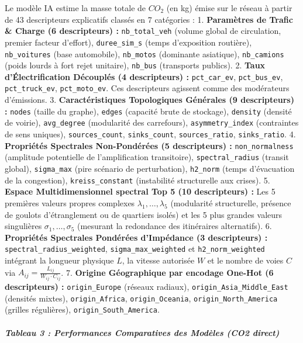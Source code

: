 \documentclass[10pt, a4paper]{article}
\begin{document}
Le modèle IA estime la masse totale de \(CO_2\) (en kg) émise sur le
réseau à partir de 43 descripteurs explicatifs classés en 7 catégories :
1. \textbf{Paramètres de Trafic \& Charge (6 descripteurs) :}
\texttt{nb\_total\_veh} (volume global de circulation, premier facteur
d'effort), \texttt{duree\_sim\_s} (temps d'exposition routière),
\texttt{nb\_voitures} (base automobile), \texttt{nb\_motos} (dominante
asiatique), \texttt{nb\_camions} (poids lourds à fort rejet unitaire),
\texttt{nb\_bus} (transports publics). 2. \textbf{Taux d'Électrification
Découplés (4 descripteurs) :} \texttt{pct\_car\_ev},
\texttt{pct\_bus\_ev}, \texttt{pct\_truck\_ev}, \texttt{pct\_moto\_ev}.
Ces descripteurs agissent comme des modérateurs d'émissions. 3.
\textbf{Caractéristiques Topologiques Générales (9 descripteurs) :}
\texttt{nodes} (taille du graphe), \texttt{edges} (capacité brute de
stockage), \texttt{density} (densité de voirie), \texttt{avg\_degree}
(modularité des carrefours), \texttt{asymmetry\_index} (contraintes de
sens uniques), \texttt{sources\_count}, \texttt{sinks\_count},
\texttt{sources\_ratio}, \texttt{sinks\_ratio}. 4. \textbf{Propriétés
Spectrales Non-Pondérées (5 descripteurs) :} \texttt{non\_normalness}
(amplitude potentielle de l'amplification transitoire),
\texttt{spectral\_radius} (transit global), \texttt{sigma\_max} (pire
scénario de perturbation), \texttt{h2\_norm} (temps d'évacuation de la
congestion), \texttt{kreiss\_constant} (instabilité structurelle aux
crises). 5. \textbf{Espace Multidimensionnel spectral Top 5 (10
descripteurs) :} Les 5 premières valeurs propres complexes
\(\lambda_1, \dots, \lambda_5\) (modularité structurelle, présence de
goulots d'étranglement ou de quartiers isolés) et les 5 plus grandes
valeurs singulières \(\sigma_1, \dots, \sigma_5\) (mesurant la
redondance des itinéraires alternatifs). 6. \textbf{Propriétés
Spectrales Pondérées d'Impédance (3 descripteurs) :}
\texttt{spectral\_radius\_weighted}, \texttt{sigma\_max\_weighted} et
\texttt{h2\_norm\_weighted} intégrant la longueur physique \(L\), la
vitesse autorisée \(W\) et le nombre de voies \(C\) via
\(A_{ij} = \frac{L_{ij}}{W_{ij} \cdot C_{ij}}\). 7. \textbf{Origine
Géographique par encodage One-Hot (6 descripteurs) :}
\texttt{origin\_Europe} (réseaux radiaux),
\texttt{origin\_Asia\_Middle\_East} (densités mixtes),
\texttt{origin\_Africa}, \texttt{origin\_Oceania},
\texttt{origin\_North\_America} (grilles régulières),
\texttt{origin\_South\_America}.

\subparagraph{Tableau 3 : Performances Comparatives des Modèles (CO2
direct)}\label{tableau-3-performances-comparatives-des-moduxe8les-co2-direct}
\end{document}
